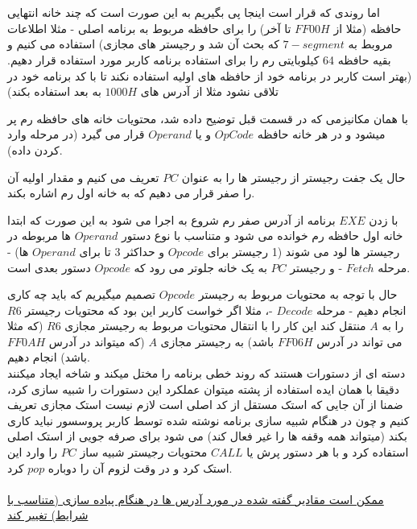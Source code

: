 \documentclass[a4paper,12pt]{article}
\begin{document}
\\
\\
اما روندی که قرار است اینجا پی بگیریم به این صورت است که چند خانه انتهایی حافظه (مثلا از $FF00H$ تا آخر) را برای حافظه مربوط به برنامه اصلی - مثلا اطلاعات مروبط به $7-segment$ که بحث آن شد و رجیستر های مجازی) استفاده می کنیم و بقیه حافظه 64 کیلوبایتی رم را برای استفاده برنامه کاربر مورد استفاده قرار دهیم. (بهتر است کاربر در برنامه خود از حافظه های اولیه استفاده نکند تا با کد برنامه خود در تلاقی نشود مثلا از آدرس های $1000H$ به بعد استفاده بکند)


با همان مکانیزمی که در قسمت قبل توضیح داده شد، محتویات خانه های حافظه رم پر میشود و در هر خانه حافظه $Op Code$ و یا $Operand$ قرار می گیرد (در مرحله وارد کردن داده).

حال یک جفت رجیستر از رجیستر ها را به عنوان $PC$ تعریف می کنیم و مقدار اولیه آن را صفر قرار می دهیم که به خانه اول رم اشاره بکند.

با زدن $EXE$ برنامه از آدرس صفر رم شروع به اجرا می شود به این صورت که ابتدا خانه اول حافظه رم خوانده می شود و متناسب با نوع دستور $Operand$ ها مربوطه در رجیستر ها لود می شوند (1 رجیستر برای $Opcode$ و حداکثر 3 تا برای $Operand$ ها) - مرحله $Fetch$ - و رجیستر $PC$ به یک خانه جلوتر می رود که $Opcode$ دستور بعدی است.

حال با توجه به محتویات مربوط به رجیستر $Opcode$ تصمیم میگیریم که باید چه کاری انجام دهیم - مرحله $Decode$ -، مثلا اگر خواست کاربر این بود که محتویات رجیستر $R6 $ را به $A$ منتقل کند این کار را با انتقال محتویات مربوط به رجیستر مجازی $R6 $ (که مثلا می تواند در آدرس $FF06H $ باشد) به رجیستر مجازی $A$ (که میتواند در آدرس $FF0AH$ باشد) انجام دهیم.
\\
دسته ای از دستورات هستند که روند خطی برنامه را مختل میکند و شاخه ایجاد میکنند دقیقا با همان ایده استفاده از پشته میتوان عملکرد این دستورات را شبیه سازی کرد، ضمنا از آن جایی که استک مستقل از کد اصلی است لازم نیست استک مجازی تعریف کنیم و چون در هنگام شبیه سازی برنامه نوشته شده توسط کاربر پروسسور نباید کاری بکند (میتواند همه وقفه ها را غیر فعال کند) می شود برای صرفه جویی از استک اصلی استفاده کرد و با هر دستور پرش یا $CALL$ محتویات رجیستر شبیه ساز $PC$ را وارد این استک کرد و در وقت لزوم آن را دوباره $pop$ کرد.
\\
\\
\underline{ممکن است مقادیر گفته شده در مورد آدرس ها در هنگام پیاده سازی (متناسب با شرایط) تغییر کند} 
\end{document}
